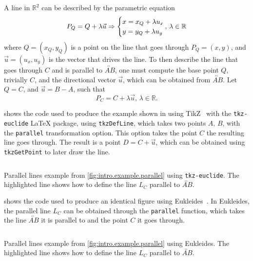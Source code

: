 A line in $\mathbb{R}^2$ can be described by the parametric equation
%
\begin{equation}\label{eq:line.vector.2}
  P_Q = Q + \lambda \vec{u} \Rightarrow \begin{cases}
    x = x_Q + \lambda u_x\\
    y = y_Q + \lambda u_y
  \end{cases}{\hskip -2.5ex}
  ,\,\lambda \in \mathbb{R}
\end{equation}
%
where $Q = (x_Q, y_Q)$ is a point on the line that goes through $P_Q = (x, y)$,
and $\vec{u} = (u_x, u_y)$ is the vector that drives the line.  To then describe
the line that goes through $C$ and is parallel to $\overleftrightarrow{AB}$, one
must compute the base point $Q$, trivially $C$, and the directional vector
$\vec{u}$, which can be obtained from $\overleftrightarrow{AB}$.  Let $Q = C$,
and $\vec{u} = B - A$, such that
\[
  P_C = C + \lambda \vec{u},\,\lambda \in \mathbb{R}.
\]

 shows the code used to produce the
example shown in  using
TikZ~\cite{Tantau:2015:tikz-manual} with the \texttt{tkz-euclide} \LaTeX{}
package, using \texttt{tkzDefLine}, which takes two points $A,\,B$, with the
\texttt{parallel} transformation option.  This option takes the point $C$ the
resulting line goes through.  The result is a point $D = C + \vec{u}$, which can
be obtained using \texttt{tkzGetPoint} to later draw the line. 

\begin{listing}[htb]
  \inputminted[highlightlines=3]{latex}{tikz/ex-parallel.tex}
  \caption[Parallel lines example using \texttt{tkz-euclide}]{
    Parallel lines example from \cref{fig:intro.example.parallel} using
    \texttt{tkz-euclide}.  The highlighted line shows how to define the line
    $L_C$ parallel to $\overleftrightarrow{AB}$.}%
  \label{lst:intro.example.parallel.tikz}
\end{listing}

 shows the code used to produce an
identical figure using Eukleides~\cite{Obrecht:2010:EM}.  In Eukleides, the
parallel line $L_C$ can be obtained through the \texttt{parallel} function,
which takes the line $\overleftrightarrow{AB}$ it is parallel to and the point
$C$ it goes through.

\begin{listing}[htb]
  \inputminted[highlightlines=3]{text}{euk/ex-parallel.euk}
  \caption[Parallel lines example using Eukleides]{
    Parallel lines example from \cref{fig:intro.example.parallel} using
    Eukleides.  The highlighted line shows how to define the line $L_C$
    parallel to $\overleftrightarrow{AB}$.}%
  \label{lst:intro.example.parallel.euk}
\end{listing}

